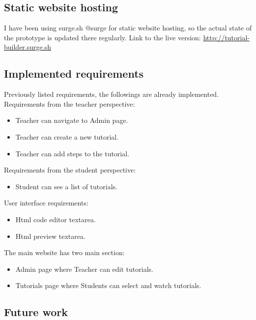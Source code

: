 \subsection{Static website hosting}\label{static-website-hosting}

I have been using surge.sh @surge for static website hosting, so the
actual state of the prototype is updated there regularly. Link to the
live version: \url{http://tutorial-builder.surge.sh}

\subsection{Implemented requirements}\label{implemented-requirements}

Previously listed requirements, the followings are already
implemented.\\
Requirements from the teacher perspective:

\begin{itemize}
\item
  Teacher can navigate to Admin page.
\item
  Teacher can create a new tutorial.
\item
  Teacher can add steps to the tutorial.
\end{itemize}

Requirements from the student perspective:

\begin{itemize}
\tightlist
\item
  Student can see a list of tutorials.
\end{itemize}

User interface requirements:

\begin{itemize}
\item
  Html code editor textarea.
\item
  Html preview textarea.
\end{itemize}

The main website has two main section:

\begin{itemize}
\item
  Admin page where Teacher can edit tutorials.
\item
  Tutorials page where Students can select and watch tutorials.
\end{itemize}

\subsection{Future work}\label{future-work}

